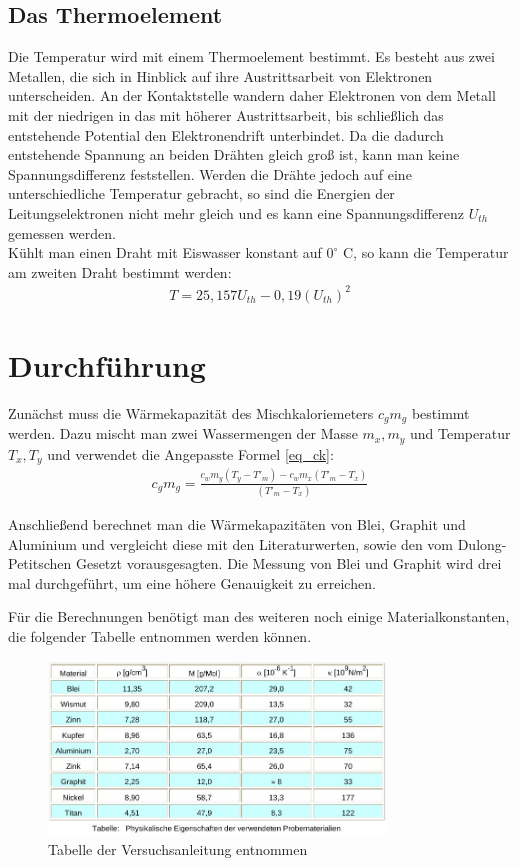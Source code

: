 \subsection{Das Thermoelement}
Die Temperatur wird mit einem Thermoelement bestimmt. Es besteht aus zwei Metallen, die sich in Hinblick auf ihre Austrittsarbeit von Elektronen unterscheiden. An der Kontaktstelle wandern daher Elektronen von dem Metall mit der niedrigen in das mit höherer Austrittsarbeit, bis schließlich das entstehende Potential den Elektronendrift unterbindet. Da die dadurch entstehende Spannung an beiden Drähten gleich groß ist, kann man keine Spannungsdifferenz feststellen. Werden die Drähte jedoch auf eine unterschiedliche Temperatur gebracht, so sind die Energien der Leitungselektronen nicht mehr gleich und es kann eine Spannungsdifferenz $U_{th}$ gemessen werden.\\
Kühlt man einen Draht mit Eiswasser konstant auf $0^\circ$ C, so kann die Temperatur am zweiten Draht bestimmt werden:
\begin{align}
T= 25,157 U_{th} -0,19 (U_{th})^2
\label{eq_temp}
\end{align} 


\section{Durchführung}
Zunächst muss die Wärmekapazität des Mischkaloriemeters $c_gm_g$ bestimmt werden. Dazu mischt man zwei Wassermengen der Masse $m_x, m_y$ und Temperatur $T_x, T_y$ und verwendet die Angepasste Formel \eqref{eq_ck}:
\begin{align}
c_gm_g = \frac{c_wm_y\left(T_y-T'_m\right) - c_wm_x\left(T'_m-T_x\right)}{\left( T'_m -T_x\right)}
\label{eq_cgmg}
\end{align}

Anschließend berechnet man die Wärmekapazitäten von Blei, Graphit und Aluminium und vergleicht diese mit den Literaturwerten, sowie den vom Dulong-Petitschen Gesetzt vorausgesagten. Die Messung von Blei und Graphit wird drei mal durchgeführt, um eine höhere Genauigkeit zu erreichen.

Für die Berechnungen benötigt man des weiteren noch einige Materialkonstanten, die folgender Tabelle entnommen werden können.
\begin{figure}[h]
\includegraphics[width=0.8\textwidth]{pics/litwerte.jpg}
\caption{Tabelle der Versuchsanleitung entnommen}
\label{pic_const}
\end{figure}


